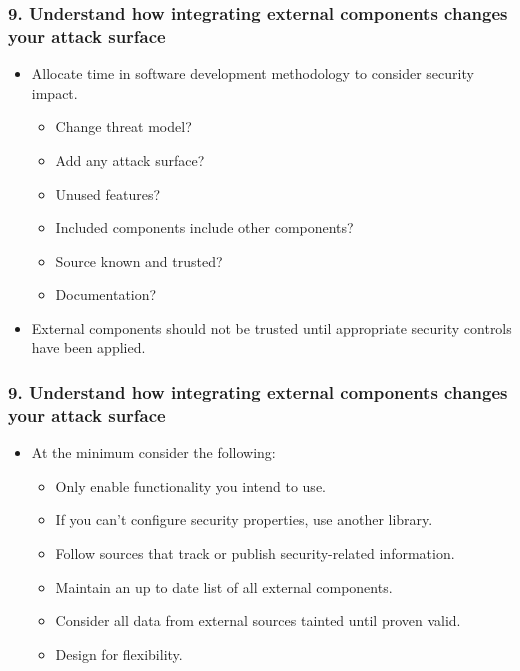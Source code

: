 \documentclass[12pt,norsk]{beamer}
\begin{document}
\begin{frame}

	\frametitle{9. Understand how integrating external components changes your attack surface}
	
	\begin{itemize}
		\item Allocate time in software development methodology to consider security impact.
		\begin{itemize}
			\item Change threat model? 
			\item Add any attack surface?
			\item Unused features?
			\item Included components include other components?
			\item Source known and trusted? 
			\item Documentation?
		\end{itemize}		 
		\item External components should not be trusted until appropriate security controls have been applied.
	\end{itemize}
	

\end{frame}


\begin{frame}

	\frametitle{9. Understand how integrating external components changes your attack surface}
	
	\begin{itemize}
		\item At the minimum consider the following:
		\begin{itemize}
			\item Only enable functionality you intend to use.
			\item If you can't configure security properties, use another library. 
			\item Follow sources that track or publish security-related information.
			\item Maintain an up to date list of all external components.
			\item Consider all data from external sources tainted  until proven valid.
			\item Design for flexibility.
		\end{itemize}
		
	\end{itemize}
	

\end{frame}
\end{document}
